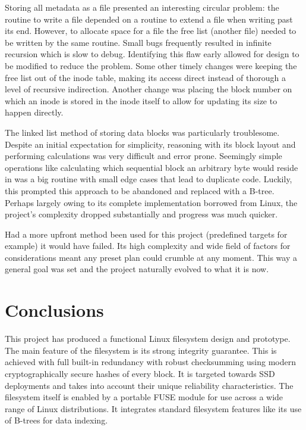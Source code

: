         Storing all metadata as a file presented an interesting circular
        problem: the routine to write a file depended on a routine to extend a
        file when writing past its end. However, to allocate space for a file
        the free list (another file) needed to be written by the same routine.
        Small bugs frequently resulted in infinite recursion which is slow to
        debug. Identifying this flaw early allowed for design to be modified to
        reduce the problem. Some other timely changes were keeping the free
        list out of the inode table, making its access direct instead of
        thorough a level of recursive indirection. Another change was placing
        the block number on which an inode is stored in the inode itself to
        allow for updating its size to happen directly.

        The linked list method of storing data blocks was particularly
        troublesome. Despite an initial expectation for simplicity, reasoning
        with its block layout and performing calculations was very difficult
        and error prone. Seemingly simple operations like calculating which
        sequential block an arbitrary byte would reside in was a big routine
        with small edge cases that lead to duplicate code. Luckily, this
        prompted this approach to be abandoned and replaced with a B-tree.
        Perhaps largely owing to its complete implementation borrowed from
        Linux, the project's complexity dropped substantially and progress was
        much quicker.

        Had a more upfront method been used for this project (predefined
        targets for example) it would have failed. Its high complexity and wide
        field of factors for considerations meant any preset plan could crumble
        at any moment. This way a general goal was set and the project
        naturally evolved to what it is now.

    \section{Conclusions}

        This project has produced a functional Linux filesystem design and
        prototype. The main feature of the filesystem is its strong integrity
        guarantee. This is achieved with full built-in redundancy with robust
        checksumming using modern cryptographically secure hashes of every
        block. It is targeted towards SSD deployments and takes into account
        their unique reliability characteristics. The filesystem itself is
        enabled by a portable FUSE module for use across a wide range of Linux
        distributions. It integrates standard filesystem features like its use
        of B-trees for data indexing.

